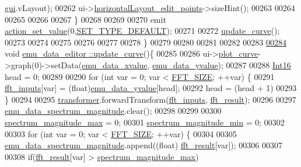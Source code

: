 \begin{DoxyCode}
      \hyperlink{a00001_ad927f72d9047284b972a0aaa5aa94b93}{gui}.vLayout);
00262            ui->\hyperlink{a00026_ae08b661288ecee049945e4a63d0c0af0}{horizontalLayout\_edit\_points}->sizeHint();
00263 
00264 
00265 
00266 
00267           \}
00268 
00269 
00270           emit \hyperlink{a00004_a7c1fa0d7d1623b11d4badceb1854010e}{action\_set\_value}(0,\hyperlink{a00034_afd1036bf6329d2ac31913e14c1f56725}{SET\_TYPE\_DEFAULT});
00271 
00272           \hyperlink{a00004_a15cbcf5f0a17281468800f47898f60c1}{update\_curve}();
00273 
00274 
00275 
00276 
00277 
00278 \}
00279 
00280 
00281 
00282 
00283 
\hypertarget{a00035_source_l00284}{}\hyperlink{a00004_a15cbcf5f0a17281468800f47898f60c1}{00284} \textcolor{keywordtype}{void} \hyperlink{a00004_a15cbcf5f0a17281468800f47898f60c1}{emu\_data\_editor ::update\_curve}()\{
00285 
00286      ui->\hyperlink{a00026_a1d46308dee8db7e3c99af65f13055479}{plot\_curve}->graph(0)->setData(\hyperlink{a00004_a66d07ec51f26cd9b84994548faa336d6}{emu\_data\_xvalue}, 
      \hyperlink{a00004_ad922d05d1e988d84f404c115fe909f72}{emu\_data\_yvalue});
00287 
00288      \hyperlink{a00001_a3985266aecb120f269789241c170850c}{Int16} head = 0;
00289 
00290      \textcolor{keywordflow}{for} (\textcolor{keywordtype}{int} var = 0; var < \hyperlink{a00036_a636ddc19af00bc87969a07c88331f105}{FFT\_SIZE}; ++var) \{
00291          \hyperlink{a00004_a8782fc20094d65d56c04869b9692902e}{fft\_inputs}[var] = (float)\hyperlink{a00004_ad922d05d1e988d84f404c115fe909f72}{emu\_data\_yvalue}[head];
00292          head = (head + 1)%
00293      \}
00294 
00295      \hyperlink{a00004_a0d6e12337ef942452edea37827e58cd4}{transformer}.forwardTransform(\hyperlink{a00004_a8782fc20094d65d56c04869b9692902e}{fft\_inputs}, \hyperlink{a00004_a63b6150bfbba86ba943877a2f547ddd8}{fft\_result});
00296 
00297      \hyperlink{a00004_ac3c515466f79ab8e60a58e8d15a3b991}{emu\_data\_spectrum\_magnitude}.clear();
00298 
00299 
00300      \hyperlink{a00004_ae0119c7dd2179cdcb3ea37adbefdc289}{spectrum\_magnitude\_max} = 0;
00301      \hyperlink{a00004_afb692cc49c350d4bf120ca1e3dd61e93}{spectrum\_magnitude\_min} = 0;
00302 
00303      \textcolor{keywordflow}{for} (\textcolor{keywordtype}{int} var = 0; var < \hyperlink{a00036_a636ddc19af00bc87969a07c88331f105}{FFT\_SIZE}; ++var) \{
00304 
00305          \hyperlink{a00004_ac3c515466f79ab8e60a58e8d15a3b991}{emu\_data\_spectrum\_magnitude}.append((\textcolor{keywordtype}{float})
      \hyperlink{a00004_a63b6150bfbba86ba943877a2f547ddd8}{fft\_result}[var]);
00306 
00307 
00308          \textcolor{keywordflow}{if}(\hyperlink{a00004_a63b6150bfbba86ba943877a2f547ddd8}{fft\_result}[var] > \hyperlink{a00004_ae0119c7dd2179cdcb3ea37adbefdc289}{spectrum\_magnitude\_max})

\end{DoxyCode}
